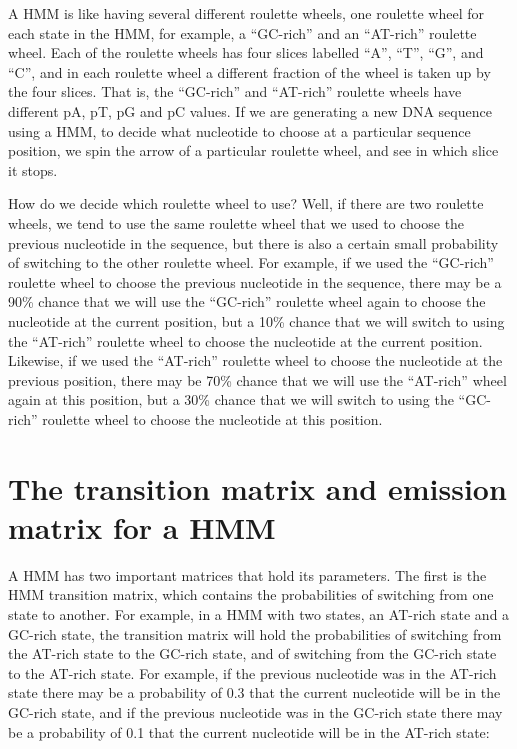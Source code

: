 \documentclass[
]{book}
\begin{document}
A HMM is like having several different roulette wheels, one roulette wheel for each state in the HMM, for example, a ``GC-rich'' and an ``AT-rich'' roulette wheel. Each of the roulette wheels has four slices labelled ``A'', ``T'', ``G'', and ``C'', and in each roulette wheel a different fraction of the wheel is taken up by the four slices. That is, the ``GC-rich'' and ``AT-rich'' roulette wheels have different pA, pT, pG and pC values. If we are generating a new DNA sequence using a HMM, to decide what nucleotide to choose at a particular sequence position, we spin the arrow of a particular roulette wheel, and see in which slice it stops.

How do we decide which roulette wheel to use? Well, if there are two roulette wheels, we tend to use the same roulette wheel that we used to choose the previous nucleotide in the sequence, but there is also a certain small probability of switching to the other roulette wheel. For example, if we used the ``GC-rich'' roulette wheel to choose the previous nucleotide in the sequence, there may be a 90\% chance that we will use the ``GC-rich'' roulette wheel again to choose the nucleotide at the current position, but a 10\% chance that we will switch to using the ``AT-rich'' roulette wheel to choose the nucleotide at the current position. Likewise, if we used the ``AT-rich'' roulette wheel to choose the nucleotide at the previous position, there may be 70\% chance that we will use the ``AT-rich'' wheel again at this position, but a 30\% chance that we will switch to using the ``GC-rich'' roulette wheel to choose the nucleotide at this position.

\hypertarget{the-transition-matrix-and-emission-matrix-for-a-hmm}{%
\section{The transition matrix and emission matrix for a HMM}\label{the-transition-matrix-and-emission-matrix-for-a-hmm}}

A HMM has two important matrices that hold its parameters. The first is the HMM transition matrix, which contains the probabilities of switching from one state to another. For example, in a HMM with two states, an AT-rich state and a GC-rich state, the transition matrix will hold the probabilities of switching from the AT-rich state to the GC-rich state, and of switching from the GC-rich state to the AT-rich state. For example, if the previous nucleotide was in the AT-rich state there may be a probability of 0.3 that the current nucleotide will be in the GC-rich state, and if the previous nucleotide was in the GC-rich state there may be a probability of 0.1 that the current nucleotide will be in the AT-rich state:
\end{document}
